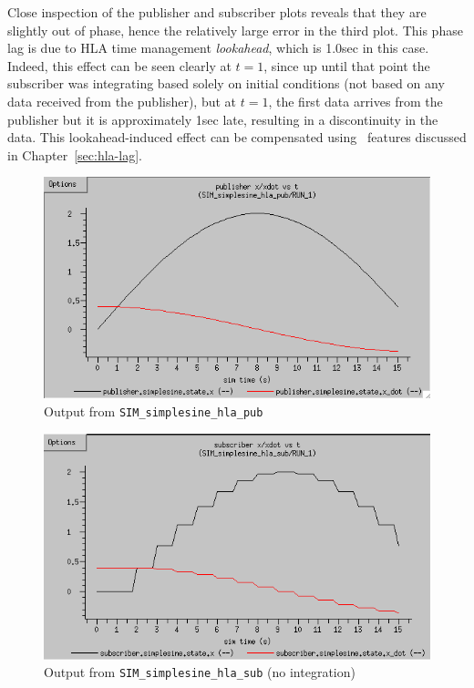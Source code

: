 Close inspection of the publisher and subscriber plots reveals that
they are slightly out of phase, hence the relatively large error
in the third plot.
This phase lag is due to HLA time management {\em lookahead},
which is 1.0sec in this case.
Indeed, this effect can be seen clearly at $t=1$, since up until that
point the subscriber was integrating based solely on initial conditions
(not based on any data received from the publisher),
but at $t=1$, the first data arrives from the publisher but it is
approximately 1sec late, resulting in a discontinuity in the data.
This lookahead-induced effect can be compensated using \TrickHLA\ features
discussed in Chapter~\ref{sec:hla-lag}.

\begin{figure}[b]
  \begin{center}
    \includegraphics[width=4.5in]{TrickHLAUser-SIM-hla-pub.png}
  \end{center}
\caption{Output from {\tt SIM\_simplesine\_hla\_pub}}
\label{fig:hla-pub-output}
\end{figure}

\begin{figure}[b]
  \begin{center}
    \includegraphics[width=4.5in]{TrickHLAUser-SIM-hla-sub-noInteg.png}
  \end{center}
\caption{Output from {\tt SIM\_simplesine\_hla\_sub} (no integration)}
\label{fig:hla-sub-noInteg-output}
\end{figure}

